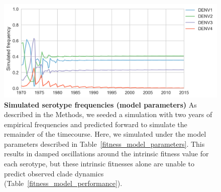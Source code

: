 \documentclass[11pt,oneside,letterpaper]{article}
\begin{document}
\begin{figure}[ht]
  \centering
  \includegraphics[width=\textwidth]{../figures/png/simulated_fitParameters_freqs.png}
  \caption{\textbf{Simulated serotype frequencies (model parameters)}
  As described in the Methods, we seeded a simulation with two years of empirical frequencies and predicted forward to simulate the remainder of the timecourse.
  Here, we simulated under the model parameters described in Table~\ref{fitness_model_parameters}.
  This results in damped oscillations around the intrinsic fitness value for each serotype, but these intrinsic fitnesses alone are unable to predict observed clade dynamics (Table~\ref{fitness_model_performance}).}
\label{simulated_frequencies_modelParameters}
\end{figure}
\end{document}
